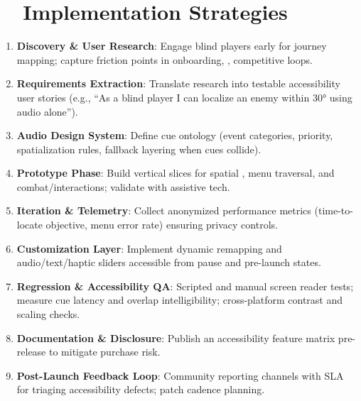 \section{~~Implementation Strategies}
\label{sec:gaming-implementation}
\begin{enumerate}
	\item \textbf{Discovery \& User Research}: Engage blind players early for journey mapping; capture friction points in onboarding, , competitive loops.
	\item \textbf{Requirements Extraction}: Translate research into testable accessibility user stories (e.g., “As a blind player I can localize an enemy within 30° using audio alone”).
	\item \textbf{Audio Design System}: Define cue ontology (event categories, priority, spatialization rules, fallback layering when cues collide).
	\item \textbf{Prototype Phase}: Build vertical slices for spatial , menu traversal, and combat/interactions; validate with assistive tech.
	\item \textbf{Iteration \& Telemetry}: Collect anonymized performance metrics (time-to-locate objective, menu  error rate) ensuring privacy controls.
	\item \textbf{Customization Layer}: Implement dynamic remapping and audio/text/haptic sliders accessible from pause and pre-launch states.
	\item \textbf{Regression \& Accessibility QA}: Scripted and manual screen reader tests; measure cue latency and overlap intelligibility; cross-platform contrast and scaling checks.
	\item \textbf{Documentation \& Disclosure}: Publish an accessibility feature matrix pre-release to mitigate purchase risk\supercite{ScopeGamingReport}.
	\item \textbf{Post-Launch Feedback Loop}: Community reporting channels with SLA for triaging accessibility defects; patch cadence planning.
\end{enumerate}

